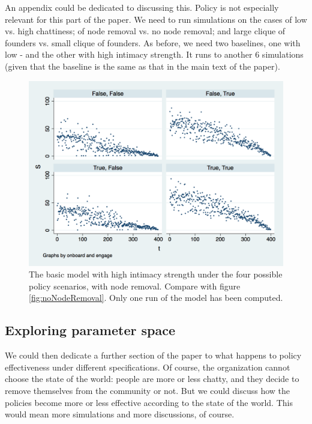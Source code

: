 \documentclass{article}
\begin{document}
An appendix could be dedicated to discussing this. Policy is not especially relevant for this part of the paper. We need to run simulations on the cases of low vs. high chattiness; of node removal vs. no node removal; and large clique of founders vs. small clique of founders. As before, we need two baselines, one with low - and the other with high intimacy strength. It runs to another 6 simulations (given that the baseline is the same as that in the main text of the paper). 

\begin{figure}
	\includegraphics[width = \textwidth]{node_removal.png} 
	\caption{The basic model with high intimacy strength under the four possible policy scenarios, with node removal. Compare with figure \ref{fig:noNodeRemoval}. Only one run of the model has been computed.}
	\label{fig:nodeRemoval}
\end{figure}

\subsection{Exploring parameter space}

We could then dedicate a further section of the paper to what happens to policy effectiveness under different specifications. Of course, the organization cannot choose the state of the world: people are more or less chatty, and they decide to remove themselves from the community or not. But we could discuss how the policies become more or less effective according to the state of the world. This would mean more simulations and more discussions, of course.
\end{document}
